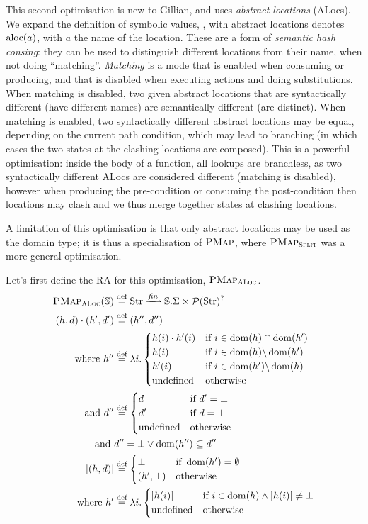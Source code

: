 This second optimisation is new to Gillian, and uses \emph{abstract locations} (ALocs). We expand the definition of symbolic values, , with abstract locations denotes $\text{aloc}(a)$, with $a$ the name of the location. These are a form of \emph{semantic hash consing}: they can be used to distinguish different locations from their name, when not doing ``matching''. \emph{Matching} is a mode that is enabled when consuming or producing, and that is disabled when executing actions and doing substitutions. When matching is disabled, two given abstract locations that are syntactically different (have different names) are semantically different (are distinct). When matching is enabled, two syntactically different abstract locations may be equal, depending on the current path condition, which may lead to branching (in which cases the two states at the clashing locations are composed). This is a powerful optimisation: inside the body of a function, all lookups are branchless, as two syntactically different ALocs are considered different (matching is disabled), however when producing the pre-condition or consuming the post-condition then locations may clash and we thus merge together states at clashing locations.

A limitation of this optimisation is that only abstract locations may be used as the domain type; it is thus a specialisation of $\textsc{PMap}$, where $\textsc{PMap}_{\textsc{Split}}$ was a more general optimisation.

Let's first define the RA for this optimisation, $\textsc{PMap}_{\textsc{ALoc}}$.
\begin{align*}
	\ALocPMap(\mmdl) &\defeq \Str \finmap \mmdl.\Sigma \times \pset(\Str)^?\\
		(h,d)\cdot (h',d') &\defeq (h'', d'') \\
	\text{where } h''&\defeq \lambda i.\begin{cases}
		h(i)\cdot h'(i)&\If~i\in \dom(h)\cap\dom(h')\\
		h(i) &\If~i\in \dom(h) \backslash \dom(h')\\
		h'(i) &\If~i\in \dom(h') \backslash \dom(h)\\
		\text{undefined}&\Otherwise
	\end{cases}\\
	\text{and }d''&\defeq\begin{cases}
		d&\If~d'=\bot\\
		d'&\If~d=\bot\\
		\text{undefined}&\Otherwise
	\end{cases}\\
	\text{and }& d'' = \bot \lor \dom(h'')\subseteq d''\\
	|(h, d)| &\defeq \begin{cases}
		\bot &\If~\dom(h')=\emptyset\\
		(h', \bot) &\Otherwise
	\end{cases}\\
	\text{where }h'&\defeq \lambda i.\begin{cases}
		|h(i)| &\If~ i\in\dom(h) \land |h(i)| \neq \bot\\
		\text{undefined} &\Otherwise
	\end{cases}
\end{align*}

